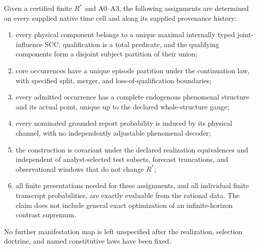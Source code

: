 \begin{theorem}\label{thm:completion}
Given a certified finite $R^\ast$ and A0--A3, the following assignments are determined on every supplied native time cell and along its supplied provenance history:
\begin{enumerate}[label=(\roman*)]
\item every physical component belongs to a unique maximal internally typed joint-influence SCC; qualification is a total predicate, and the qualifying components form a disjoint subject partition of their union;
\item core occurrences have a unique episode partition under the continuation law, with specified split, merger, and loss-of-qualification boundaries;
\item every admitted occurrence has a complete endogenous phenomenal structure and its actual point, unique up to the declared whole-structure gauge;
\item every nominated grounded report probability is induced by its physical channel, with no independently adjustable phenomenal decoder;
\item the construction is covariant under the declared realization equivalences and independent of analyst-selected test subsets, forecast truncations, and observational windows that do not change $R^\ast$;
\item all finite presentations needed for these assignments, and all individual finite transcript probabilities, are exactly evaluable from the rational data. The claim does not include general exact optimization of an infinite-horizon contrast supremum.
\end{enumerate}
No further manifestation map is left unspecified after the realization, selection doctrine, and named constitutive laws have been fixed.
\end{theorem}
